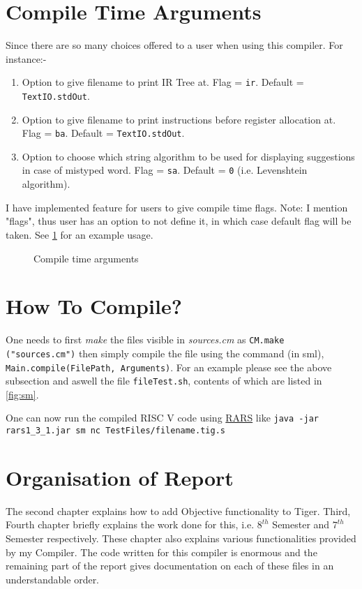 \section{Compile Time Arguments}

Since there are so many choices offered to a user when using this compiler. For instance:-

\begin{enumerate}
  \item Option to give filename to print IR Tree at. Flag = \texttt{ir}. Default = \texttt{TextIO.stdOut}.
  \item Option to give filename to print instructions before register allocation at. Flag = \texttt{ba}. Default = \texttt{TextIO.stdOut}.
  \item Option to choose which string algorithm to be used for displaying suggestions in case of mistyped word. Flag = \texttt{sa}. Default = \texttt{0} (i.e. Levenshtein algorithm).
\end{enumerate}

I have implemented feature for users to give compile time flags. Note: I mention "flags", thus user has an option to not define it, in which case default flag will be taken. See \ref{fig:flags} for an example usage.


\begin{figure}
\centering
{}
\caption{Compile time arguments}
\label{fig:flags}
\end{figure}

\section{How To Compile?}

One needs to first \textit{make} the files visible in \textit{sources.cm} as \texttt{CM.make ("sources.cm")} then simply compile the file using the command (in sml), \texttt{Main.compile(FilePath, Arguments)}. For an example please see the above subsection and aswell the file \texttt{fileTest.sh}, contents of which are listed in \ref{fig:sm}.

One can now run the compiled RISC V code using \href{https://github.com/TheThirdOne/rars}{RARS} like \texttt{java -jar rars1\_3\_1.jar sm nc TestFiles/filename.tig.s}

\section{Organisation of Report}

The second chapter explains how to add Objective functionality to Tiger. Third, Fourth chapter briefly explains the work done for this, i.e. $8^{th}$ Semester and $7^{th}$ Semester respectively. These chapter also explains various functionalities provided by my Compiler. The code written for this compiler is enormous and the remaining part of the report gives documentation on each of these files in an understandable order.